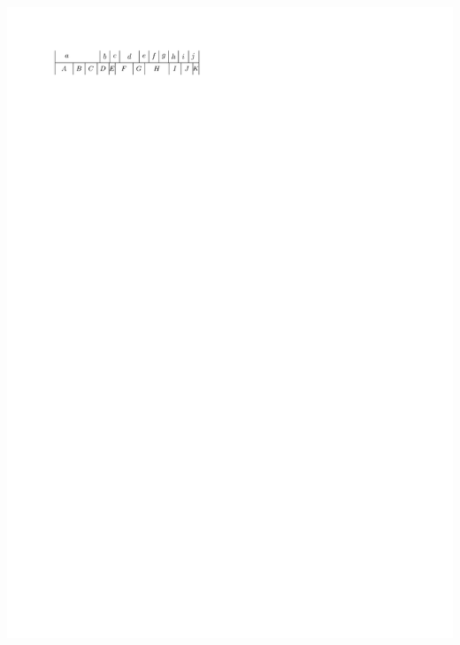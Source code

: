 \documentclass[a4paper]{article}
\begin{document}
\includegraphics[width=\textwidth]{./introduction/img/10sidedAfter.pdf}
\clearpage%
\end{document}
